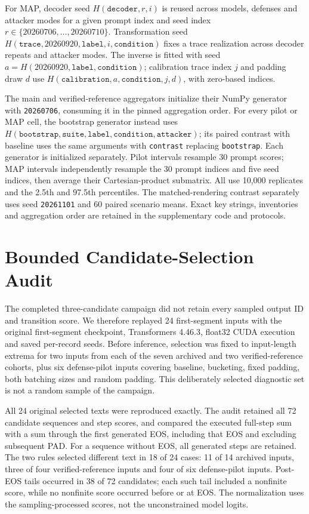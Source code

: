 \documentclass[electronics,article,submit,pdftex,moreauthors]{Definitions/mdpi}
\begin{document}
For MAP, decoder seed $H(\texttt{decoder},r,i)$ is reused across models, defenses and attacker modes for a given prompt index and seed index $r\in\{20260706,\ldots,20260710\}$. Transformation seed $H(\texttt{trace},20260920,\texttt{label},i,\texttt{condition})$ fixes a trace realization across decoder repeats and attacker modes. The inverse is fitted with seed $a=H(20260920,\texttt{label},\texttt{condition})$; calibration trace index $j$ and padding draw $d$ use $H(\texttt{calibration},a,\texttt{condition},j,d)$, with zero-based indices.

The main and verified-reference aggregators initialize their NumPy generator with \texttt{20260706}, consuming it in the pinned aggregation order. For every pilot or MAP cell, the bootstrap generator instead uses $H(\texttt{bootstrap},\texttt{suite},\texttt{label},\texttt{condition},\texttt{attacker})$; its paired contrast with baseline uses the same arguments with \texttt{contrast} replacing \texttt{bootstrap}. Each generator is initialized separately. Pilot intervals resample 30 prompt scores; MAP intervals independently resample the 30 prompt indices and five seed indices, then average their Cartesian-product submatrix. All use 10,000 replicates and the 2.5th and 97.5th percentiles. The matched-rendering contrast separately uses seed \texttt{20261101} and 60 paired scenario means. Exact key strings, inventories and aggregation order are retained in the supplementary code and protocols.

\section{Bounded Candidate-Selection Audit}\label{app:selector}
The completed three-candidate campaign did not retain every sampled output ID and transition score. We therefore replayed 24 first-segment inputs with the original first-segment checkpoint, Transformers 4.46.3, float32 CUDA execution and saved per-record seeds. Before inference, selection was fixed to input-length extrema for two inputs from each of the seven archived and two verified-reference cohorts, plus six defense-pilot inputs covering baseline, bucketing, fixed padding, both batching sizes and random padding. This deliberately selected diagnostic set is not a random sample of the campaign.

All 24 original selected texts were reproduced exactly. The audit retained all 72 candidate sequences and step scores, and compared the executed full-step sum with a sum through the first generated EOS, including that EOS and excluding subsequent PAD. For a sequence without EOS, all generated steps are retained. The two rules selected different text in 18 of 24 cases: 11 of 14 archived inputs, three of four verified-reference inputs and four of six defense-pilot inputs. Post-EOS tails occurred in 38 of 72 candidates; each such tail included a nonfinite score, while no nonfinite score occurred before or at EOS. The normalization uses the sampling-processed scores, not the unconstrained model logits.
\end{document}
